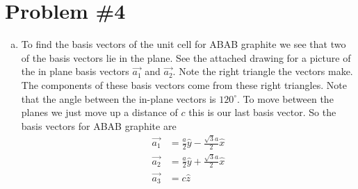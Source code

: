 \documentclass[11pt]{article}
\numberwithin{equation}{section}
\begin{document}
\section{Problem \#4}
\begin{enumerate}[(a)]
\item
To find the basis vectors of the unit cell for ABAB graphite we see that two of the basis vectors lie in the plane. See the attached drawing for a picture of the in plane basis vectors $\vec{a_1}$ and $\vec{a_2}$. Note the right triangle the vectors make. The components of these basis vectors come from these right triangles. Note that the angle between the in-plane vectors is $120^{\circ}$. To move between the planes we just move up a distance of $c$ this is our last basis vector. So the basis vectors for ABAB graphite are
\begin{align*}
\vec{a_1} &= \frac{a}{2}\hat{y} - \frac{\sqrt{3}a}{2}\hat{x}\\
\vec{a_2} &= \frac{a}{2}\hat{y} + \frac{\sqrt{3}a}{2}\hat{x}\\
\vec{a_3} &= c\hat{z}
\end{align*}


\end{enumerate}
\end{document}
